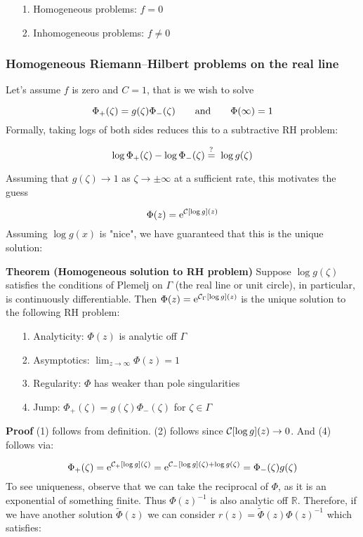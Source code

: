 \documentclass[12pt,a4paper]{article}
\def\qqand{\qquad\hbox{and}\qquad}
\def\E{ {\rm e} }
\def\R{ {\mathbb R} }
\def\CC{ {\cal C} }
\def\endash{–}
\def\questionequals{= \!\!\!\!\!\!{\scriptstyle ? \atop }\,\,\,}
\begin{document}
\begin{itemize}
\item[1. ] Homogeneous problems: $f = 0$


\item[2. ] Inhomogeneous problems: $f \neq 0$

\end{itemize}
\subsubsection{Homogeneous Riemann\ensuremath{\endash}Hilbert problems on the real line}
Let's assume $f$ is zero and $C = 1$, that is we wish to solve

\[
\Phi_+(\zeta) = g(\zeta) \Phi_-(\zeta) \qqand \Phi(\infty) = 1
\]
Formally, taking logs of both sides reduces this to a subtractive RH problem:

\[
\log \Phi_+(\zeta) - \log\Phi_-(\zeta) \questionequals \log g(\zeta)
\]
Assuming that $g(\zeta) \rightarrow 1$ as $\zeta \rightarrow \pm \infty$ at a sufficient rate, this motivates the guess

\[
\Phi(z) = \E^{\CC[\log g](z)}
\]
Assuming $\log g(x)$ is "nice", we have guaranteed that this is the unique solution:

\textbf{Theorem (Homogeneous solution to RH problem)} Suppose $\log g(\zeta)$ satisfies the conditions of Plemelj on $\Gamma$ (the real line or unit circle), in particular, is continuously differentiable. Then $\Phi(z) = \E^{\CC_\Gamma[\log g](z)}$ is the unique solution to the following RH problem:

\begin{itemize}
\item[1. ] Analyticity: $\Phi(z)$ is analytic off $\Gamma$


\item[2. ] Asymptotics: $\lim_{z\rightarrow \infty}\Phi(z) = 1$


\item[3. ] Regularity: $\Phi$ has weaker than pole singularities


\item[4. ] Jump: $\Phi_+(\zeta) = g(\zeta) \Phi_-(\zeta)$ for $\zeta \in \Gamma$

\end{itemize}
\textbf{Proof} (1) follows from definition. (2) follows since $\CC[\log g](z) \rightarrow 0$. And (4) follows via:

\[
\Phi_+(\zeta) = \E^{\CC_+[\log g](\zeta)} = \E^{\CC_-[\log g](\zeta) + \log g(\zeta)} = \Phi_-(\zeta) g(\zeta)
\]
To see uniqueness, observe that we can take the reciprocal of $\Phi$, as it is an exponential of something finite. Thus $\Phi(z)^{-1}$ is also analytic off $\R$. Therefore, if we have another solution $\tilde \Phi(z)$ we can consider $r(z) = \tilde\Phi(z) \Phi(z)^{-1}$ which satisfies:
\end{document}
